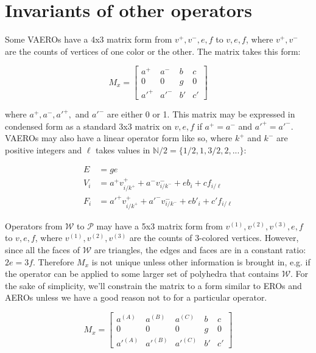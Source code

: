 \documentclass[12pt]{amsart}%
\begin{document}
\section{Invariants of other operators}
Some VAEROs have a 4x3 matrix form from $v^+, v^-, e, f$ to $v, e, f$, where
$v^+, v^-$ are the counts of vertices of one color or the other. The matrix takes
this form:

\begin{equation}
  M_x = \begin{bmatrix}
  a^+ & a^- & b & c \\
  0 & 0 & g & 0 \\
  a'^+ & a'^- & b' & c' \end{bmatrix}
\end{equation}

where $a^+, a^-, a'^+,$ and $a'^-$ are either 0 or 1. This matrix may be
expressed in condensed form as a standard 3x3 matrix on $v, e, f$ if $a^+ = a^-$
and $a'^+ = a'^-$. VAEROs may also have a linear operator form like so, where $k^+$ and $k^-$ are positive integers and $\ell$ takes values in
$\mathbb{N}/2 = \{1/2, 1, 3/2, 2, ...\}$:

\begin{equation}
  \begin{split}
  E & = ge \\
  V_i & = a^+ v^+_{i/k^+} + a^- v^-_{i/k^-} + e b_i + c f_{i/\ell} \\
  F_i & = a'^+ v^+_{i/k^+} + a'^- v^-_{i/k^-} + e b'_i + c' f_{i/\ell}
  \end{split}
\end{equation}

Operators from $\mathcal{W}$ to $\mathcal{P}$ may have a 5x3 matrix form
from $v^{(1)}, v^{(2)}, v^{(3)}, e, f$ to $v, e, f$, where $v^{(1)}, v^{(2)},
v^{(3)}$ are the counts of 3-colored vertices. However, since all the faces of
$\mathcal{W}$ are triangles, the edges and faces are in a constant ratio: $2e =
3f$. Therefore $M_x$ is not unique unless other information is brought in, e.g.
if the operator can be applied to some larger set of polyhedra that contains
$\mathcal{W}$. For the sake of simplicity, we'll constrain the matrix to a form
similar to EROs and AEROs unless we have a good reason not to for a particular
operator.

\begin{equation}
  M_x = \begin{bmatrix}
  a^{(A)} & a^{(B)} & a^{(C)} & b & c \\
  0 & 0 & 0 & g & 0 \\
  {a'}^{(A)} & {a'}^{(B)} & {a'}^{(C)} & b' & c' \end{bmatrix}
\end{equation}
\end{document}
